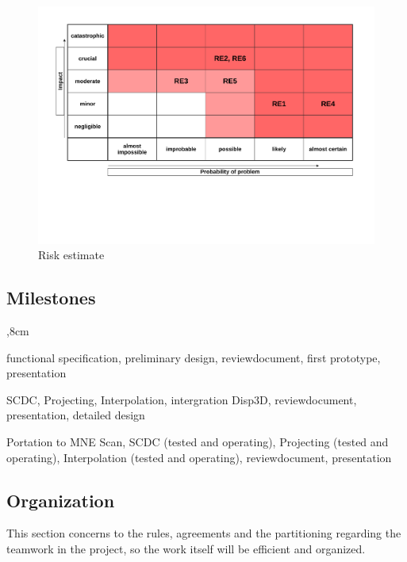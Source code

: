 \begin{figure}[h]
	\begin{center}
		\includegraphics[width= 15cm]{figures/Risikoabschaetzung.pdf}
		\caption{Risk estimate}
	\end{center}
\end{figure}

\clearpage

\subsection{Milestones}
\begin{description}
	,8cm
	\item[First Phase Milestones:] functional specification, preliminary design, reviewdocument, first prototype, presentation 
	
	\item[Second Phase Milestone:] SCDC, Projecting, Interpolation, intergration Disp3D, reviewdocument, presentation, detailed design
	
	\item[Third Phase Milenstone:] Portation to MNE Scan, SCDC (tested and operating), Projecting (tested and operating), Interpolation (tested and operating), reviewdocument, presentation
\end{description}



\subsection{Organization}

This section concerns to the rules, agreements and the partitioning regarding the teamwork in the project, so the work itself will be efficient and organized. 

